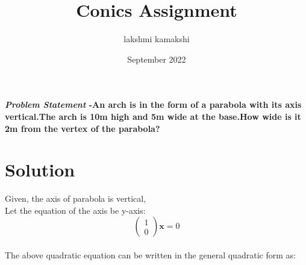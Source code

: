 \documentclass[journal,10pt,twocolumn]{article}
\title{\textbf{Conics Assignment}}
\author{lakshmi kamakshi}
\date{September 2022}
\newcommand{\myvec}[1]{\ensuremath{\begin{pmatrix}#1\end{pmatrix}}}
\begin{document}
\maketitle
\paragraph{\textit{Problem Statement} -An arch is in the form of a parabola with its axis vertical.The arch is 10m high and 5m wide at the base.How wide is it 2m from the vertex of the parabola?} \vspace{5mm}

\section*{\large Solution}


Given, the axis of parabola is vertical,
\\ Let the equation of the axis be y-axis:
\begin{equation}
	\label{eq:parabola_q}
	\myvec{1\\0}\textbf{x}= 0
\end{equation}
\\ The above quadratic equation can be written in the general quadratic form as:
\end{document}
